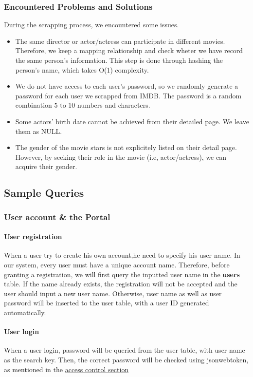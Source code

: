 \begin{CJK*}{UTF8}{gbsn}
\subsubsection{Encountered Problems and Solutions}
During the scrapping process, we encountered some issues.
\begin{itemize}
    \item The same director or actor/actress can participate in different movies. Therefore, we keep a mapping relationship and check wheter we have record the same person's information. This step is done through hashing the person's name, which takes O(1) complexity.
    \item We do not have access to each user's password, so we randomly generate a password for each user we scrapped from IMDB. The password is a random combination 5 to 10 numbers and characters.
    \item Some actors' birth date cannot be achieved from their detailed page. We leave them as NULL.
    \item The gender of the movie stars is not explicitely listed on their detail page. However, by seeking their role in the movie (i.e, actor/actress), we can acquire their gender.
\end{itemize}
\subsection{Sample Queries}
\subsubsection{User account \& the Portal}
\paragraph{User registration}
When a user try to create his own account,he need to specify his user name. In our system, every user must have a unique account name. Therefore, before granting a registration, we will first query the inputted user name in the \textbf{users} table. If the name already exists, the registration will not be accepted and the user should input a new user name. Otherwise, user name as well as user password will be inserted to the user table, with a user ID generated automatically.






\paragraph{User login}
When a user login, password will be queried from the user table, with user name as the search key. Then, the correct password will be checked using jsonwebtoken, as mentioned in the \hyperref[sec:access]{access control section}


\end{CJK*}
